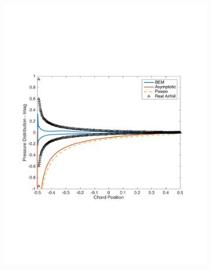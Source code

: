 \documentclass{article}
\begin{document}
\begin{figure}[h]
\begin{subfigure}{0.3\textwidth}
	\includegraphics[width = \textwidth, height=0.16\textheight]{NACA0003_pressure_k15_imag}
\end{subfigure}%
\begin{subfigure}{0.33\textwidth}
	\centering

\end{subfigure}
\end{figure}
\end{document}
